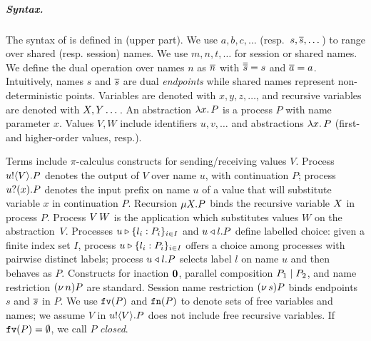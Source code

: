 \documentclass[a4paper,UKenglish]{lipics}
\theoremstyle{definition}
\begin{document}
\subparagraph{Syntax.} 
The syntax of \HOp is defined in  (upper part).
We use $a,b,c, \dots$ (resp.~$s, \overline{s}, \dots$) 
to range over shared (resp. session) names. 
We use $m, n, t, \dots$ for session or shared names. 
We define the dual operation over names $n$ as $\overline{n}$ with
$\overline{\overline{s}} = s$ and $\overline{a} = a$.
Intuitively, names $s$ and $\overline{s}$ are dual  \emph{endpoints} while 
shared names represent non-deterministic points. 
Variables are denoted with $x, y, z, \dots$, 
and recursive variables are denoted with $X, Y \dots$.
An abstraction %
$\lambda x.\,P$ is a process $P$ with name parameter $x$.
Values $V,W$ include 
identifiers $u, v, \ldots$ %
and 
abstractions $\lambda x.\,P$ (first- and higher-order values, resp.). 

{Terms} 
include $\pi$-calculus constructs for sending/receiving values $V$.
Process $u ! \langle V \rangle . P$ denotes the output of   $V$
over name $u$, with continuation $P$;
process $u ? (x) . P$ denotes the input prefix on name $u$ of a value
that 
will substitute variable $x$ in continuation $P$. 
Recursion %
$\mu X. P$
binds the recursive variable $X$ in process $P$.
Process 
$V\, {W}$ 
is the application
which substitutes values $W$ on the abstraction~$V$. 
Processes $u \triangleright \{l_i: P_i\}_{i \in I}$  and $u \triangleleft l . P$ define labelled choice:
given a finite index set $I$, process $u \triangleright \{l_i: P_i\}_{i \in I}$ offers a choice 
among processes with pairwise distinct labels;
 process $u \triangleleft l . P$ selects label $l$ on name $u$ and then behaves as $P$.
Constructs for 
inaction $\mathbf{0}$,  parallel composition $P_1 \;|\; P_2$, and 
name restriction $(\nu\, n) P$ are standard.
Session name restriction $(\nu\, s) P$ %
binds endpoints $s$ and $\overline{s}$ in $P$.
We use $\mathtt{fv}(P)$ and $\mathtt{fn}(P)$ to denote sets of free 
variables and names; 
we assume $V$ in $u ! \langle V \rangle .{P}$ does not include free recursive 
variables. %
If $\mathtt{fv}(P) = \emptyset$, we call $P$ {\em closed}.
\end{document}
